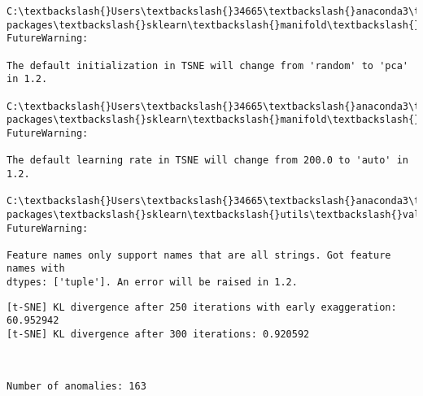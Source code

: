 \documentclass[11pt]{article}
\begin{document}
    \begin{Verbatim}[commandchars=\\\{\}]
C:\textbackslash{}Users\textbackslash{}34665\textbackslash{}anaconda3\textbackslash{}lib\textbackslash{}site-packages\textbackslash{}sklearn\textbackslash{}manifold\textbackslash{}\_t\_sne.py:780:
FutureWarning:

The default initialization in TSNE will change from 'random' to 'pca' in 1.2.

C:\textbackslash{}Users\textbackslash{}34665\textbackslash{}anaconda3\textbackslash{}lib\textbackslash{}site-packages\textbackslash{}sklearn\textbackslash{}manifold\textbackslash{}\_t\_sne.py:790:
FutureWarning:

The default learning rate in TSNE will change from 200.0 to 'auto' in 1.2.

C:\textbackslash{}Users\textbackslash{}34665\textbackslash{}anaconda3\textbackslash{}lib\textbackslash{}site-packages\textbackslash{}sklearn\textbackslash{}utils\textbackslash{}validation.py:1688:
FutureWarning:

Feature names only support names that are all strings. Got feature names with
dtypes: ['tuple']. An error will be raised in 1.2.

    \end{Verbatim}

    \begin{Verbatim}[commandchars=\\\{\}]
[t-SNE] KL divergence after 250 iterations with early exaggeration: 60.952942
[t-SNE] KL divergence after 300 iterations: 0.920592
    \end{Verbatim}

    \begin{center}
    \end{center}
    { \hspace*{\fill} \\}
    
    \begin{Verbatim}[commandchars=\\\{\}]
Number of anomalies: 163
    \end{Verbatim}
\end{document}
